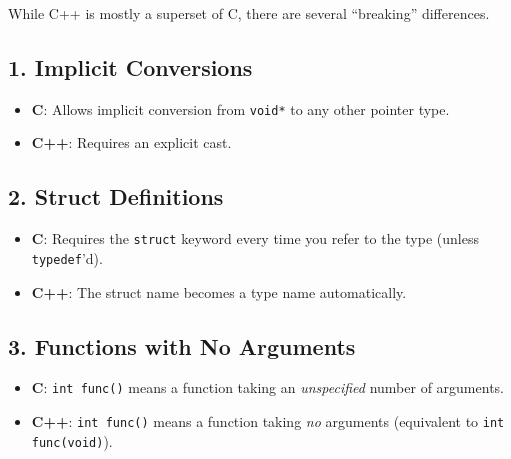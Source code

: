While C++ is mostly a superset of C, there are several ``breaking''
differences.

\hypertarget{implicit-conversions}{%
\subsection{1. Implicit Conversions}\label{implicit-conversions}}

\begin{itemize}
\tightlist
\item
  \textbf{C}: Allows implicit conversion from
  \passthrough{\lstinline!void*!} to any other pointer type.
\item
  \textbf{C++}: Requires an explicit cast.
\end{itemize}

\hypertarget{struct-definitions}{%
\subsection{2. Struct Definitions}\label{struct-definitions}}

\begin{itemize}
\tightlist
\item
  \textbf{C}: Requires the \passthrough{\lstinline!struct!} keyword
  every time you refer to the type (unless
  \passthrough{\lstinline!typedef!}'d).
\item
  \textbf{C++}: The struct name becomes a type name automatically.
\end{itemize}

\hypertarget{functions-with-no-arguments}{%
\subsection{3. Functions with No
Arguments}\label{functions-with-no-arguments}}

\begin{itemize}
\tightlist
\item
  \textbf{C}: \passthrough{\lstinline!int func()!} means a function
  taking an \emph{unspecified} number of arguments.
\item
  \textbf{C++}: \passthrough{\lstinline!int func()!} means a function
  taking \emph{no} arguments (equivalent to
  \passthrough{\lstinline!int func(void)!}).
\end{itemize}

